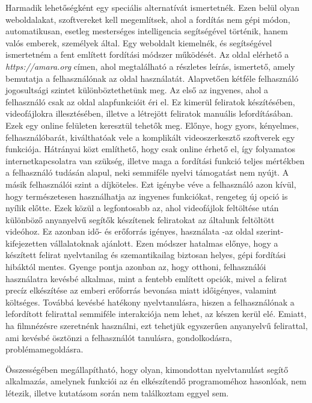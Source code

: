 Harmadik lehetőségként egy speciális alternatívát ismertetnék. Ezen belül olyan weboldalakat, szoftvereket kell megemlítsek, ahol a fordítás nem gépi módon, automatikusan, esetleg mesterséges intelligencia segítségével történik, hanem valós emberek, személyek által. Egy weboldalt kiemelnék,  és segítségével ismertetném a fent említett fordítási módszer működését. Az oldal elérhető a \textit{https://amara.org} címen, ahol megtalálható a részletes leírás, ismertető, amely bemutatja a felhasználónak az oldal használatát. Alapvetően kétféle felhasználó jogosultsági szintet különböztethetünk meg. Az első az ingyenes, ahol a felhasználó csak az oldal alapfunkcióit éri el. Ez kimerül feliratok készítésében, videofájlokra illesztésében, illetve a létrejött feliratok manuális lefordításában. Ezek egy online felületen keresztül tehetők meg. Előnye, hogy gyors, kényelmes, felhasználóbarát, kiválthatóak vele a komplikált videoszerkesztő szoftverek egy funkciója. Hátrányai közt említhető, hogy csak online érhető el, így folyamatos internetkapcsolatra van szükség, illetve maga a fordítási funkció teljes mértékben a felhasználó tudásán alapul, neki semmiféle nyelvi támogatást nem nyújt. A másik felhasználói szint a díjköteles. Ezt igénybe véve a felhasználó azon kívül, hogy természetesen használhatja az ingyenes funkciókat, rengeteg új opció is nyílik előtte. Ezek közül a legfontosabb az, ahol videofájlok feltöltése után különböző anyanyelvű segítők készítenek feliratokat az általunk feltöltött videóhoz. Ez azonban idő- és erőforrás igényes, használata -az oldal szerint- kifejezetten vállalatoknak ajánlott. Ezen módszer hatalmas előnye, hogy a készített felirat nyelvtanilag és szemantikailag biztosan helyes, gépi fordítási hibáktól mentes. Gyenge pontja azonban az, hogy otthoni, felhasználói használatra kevésbé alkalmas, mint a fentebb említett opciók, mivel a felirat precíz elkészítése az emberi erőforrás bevonása miatt időigényes, valamint költséges. Továbbá kevésbé hatékony nyelvtanulásra, hiszen a felhasználónak a lefordított felirattal semmiféle interakciója nem lehet, az készen kerül elé. Emiatt, ha filmnézésre szeretnénk használni, ezt tehetjük egyszerűen anyanyelvű felirattal, ami kevésbé ösztönzi a felhasználót tanulásra, gondolkodásra, problémamegoldásra.

Összességében megállapítható, hogy olyan, kimondottan nyelvtanulást segítő alkalmazás, amelynek funkciói az én elkészítendő programoméhoz hasonlóak, nem létezik, illetve kutatásom során nem találkoztam eggyel sem.

